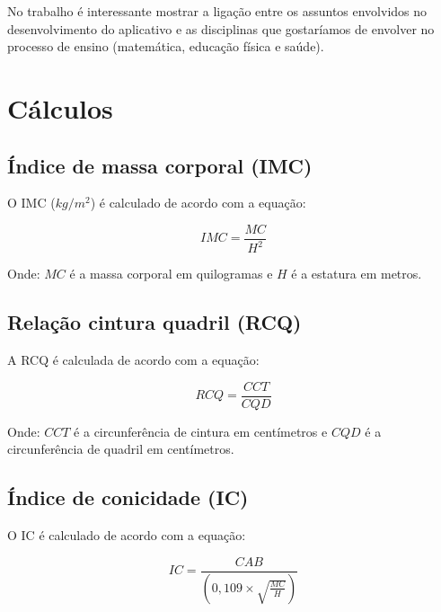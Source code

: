 \documentclass[a4paper,12pt]{report}
\begin{document}
        No trabalho é interessante mostrar a ligação entre os assuntos
        envolvidos no desenvolvimento do aplicativo e as disciplinas que
        gostaríamos de envolver no processo de ensino (matemática, educação
        física e saúde).

        \section{Cálculos}

            \subsection{Índice de massa corporal (IMC)}
            O IMC ($kg/m^2$) é calculado de acordo com a equação:

            \begin{equation}
            \label{eqn:imc}
            IMC=\frac{MC}{H^2}
            \end{equation}

            Onde: $MC$ é a massa corporal em quilogramas e $H$ é a
            estatura em metros.

            \subsection{Relação cintura quadril (RCQ)}
            A RCQ é calculada de acordo com a equação:

            \begin{equation}
            \label{eqn:rcq}
            RCQ=\frac{CCT}{CQD}
            \end{equation}

            Onde: $CCT$ é a circunferência de cintura em centímetros e $CQD$
            é a circunferência de quadril em centímetros.

            \subsection{Índice de conicidade (IC)}
            O IC é calculado de acordo com a equação:

            \begin{equation}
            \label{eqn:ic}
            IC=\frac{CAB}{(0,109\times\sqrt{\frac{MC}{H}})}
            \end{equation}
\end{document}
